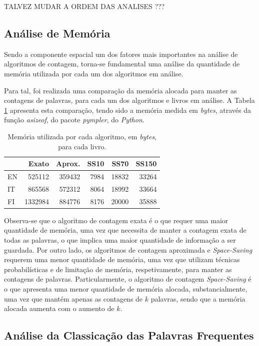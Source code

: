 \documentclass[mirror, portugues]{revdetua}
\begin{document}
TALVEZ MUDAR A ORDEM DAS ANALISES ??? %

\subsection{Análise de Memória}

Sendo a componente espacial um dos fatores mais importantes na análise de algoritmos de contagem, torna-se fundamental uma análise da quantidade de memória utilizada por cada um dos algoritmos em análise.

Para tal, foi realizada uma comparação da memória alocada para manter as contagens de palavras, para cada um dos algoritmos e livros em análise. A Tabela \ref{table:memoria} apresenta esta comparação, tendo sido a memória medida em \textit{bytes}, através da função \textit{asizeof}, do pacote \textit{pympler}, do \textit{Python}.

\begin{table}[H]
\centering
\caption{Memória utilizada por cada algoritmo, em \textit{bytes}, para cada livro.}
\label{table:memoria}
\begin{tabular}{lrrrrr}
\toprule
& Exato & Aprox. & SS10 & SS70 & SS150 \\
\midrule
EN & 525112 & 359432 & 7984 & 18832 & 33264 \\
IT & 865568 & 572312 & 8064 & 18992 & 33664 \\
FI &1332984 & 884776 & 8176 & 20000 & 35888 \\
\bottomrule
\end{tabular}
\end{table}

Observa-se que o algoritmo de contagem exata é o que requer uma maior quantidade de memória, uma vez que necessita de manter a contagem exata de todas as palavras, o que implica uma maior quantidade de informação a ser guardada. Por outro lado, os algoritmos de contagem aproximada e \textit{Space-Saving} requerem uma menor quantidade de memória, uma vez que utilizam técnicas probabilísticas e de limitação de memória, respetivamente, para manter as contagens de palavras. Particularmente, o algoritmo de contagem \textit{Space-Saving} é o que apresenta uma menor quantidade de memória alocada, substancialmente, uma vez que mantém apenas as contagens de $k$ palavras, sendo que a memória alocada aumenta com o aumento de $k$.

\subsection{Análise da Classicação das Palavras Frequentes}
\end{document}
